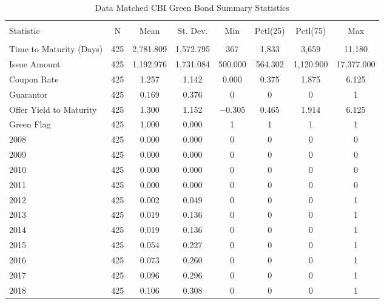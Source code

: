 \begin{table}[H] \centering
  \footnotesize
  \caption{Data Matched CBI Green Bond Summary Statistics} 
  \label{desc4} 
\begin{tabular}{@{\extracolsep{5pt}}lccccccc} 
\\[-1.8ex]\hline 
\hline \\[-1.8ex] 
Statistic & \multicolumn{1}{c}{N} & \multicolumn{1}{c}{Mean} & \multicolumn{1}{c}{St. Dev.} & \multicolumn{1}{c}{Min} & \multicolumn{1}{c}{Pctl(25)} & \multicolumn{1}{c}{Pctl(75)} & \multicolumn{1}{c}{Max} \\ 
\hline \\[-1.8ex] 
Time to Maturity (Days) & 425 & 2,781.809 & 1,572.795 & 367 & 1,833 & 3,659 & 11,180 \\ 
Issue Amount & 425 & 1,192.976 & 1,731.084 & 500.000 & 564.302 & 1,120.900 & 17,377.000 \\  
Coupon Rate & 425 & 1.257 & 1.142 & 0.000 & 0.375 & 1.875 & 6.125 \\ 
Guarantor & 425 & 0.169 & 0.376 & 0 & 0 & 0 & 1 \\ 
Offer Yield to Maturity & 425 & 1.300 & 1.152 & $-$0.305 & 0.465 & 1.914 & 6.125 \\
Green Flag & 425 & 1.000 & 0.000 & 1 & 1 & 1 & 1 \\ 
2008 & 425 & 0.000 & 0.000 & 0 & 0 & 0 & 0 \\ 
2009 & 425 & 0.000 & 0.000 & 0 & 0 & 0 & 0 \\ 
2010 & 425 & 0.000 & 0.000 & 0 & 0 & 0 & 0 \\ 
2011 & 425 & 0.000 & 0.000 & 0 & 0 & 0 & 0 \\ 
2012 & 425 & 0.002 & 0.049 & 0 & 0 & 0 & 1 \\ 
2013 & 425 & 0.019 & 0.136 & 0 & 0 & 0 & 1 \\ 
2014 & 425 & 0.019 & 0.136 & 0 & 0 & 0 & 1 \\ 
2015 & 425 & 0.054 & 0.227 & 0 & 0 & 0 & 1 \\ 
2016 & 425 & 0.073 & 0.260 & 0 & 0 & 0 & 1 \\ 
2017 & 425 & 0.096 & 0.296 & 0 & 0 & 0 & 1 \\ 
2018 & 425 & 0.106 & 0.308 & 0 & 0 & 0 & 1 \\ 

\end{tabular}
\end{table}
